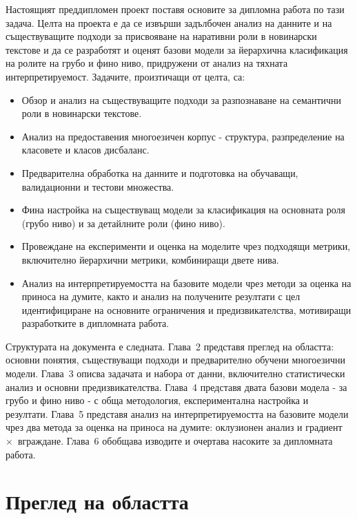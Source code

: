 \documentclass[12pt,a4paper]{report}
\begin{document}
Настоящият преддипломен проект поставя основите за дипломна работа по тази задача. Целта на проекта е да се извърши задълбочен анализ на данните и на съществуващите подходи за присвояване на наративни роли в новинарски текстове и да се разработят и оценят базови модели за йерархична класификация на ролите на грубо и фино ниво, придружени от анализ на тяхната интерпретируемост. Задачите, произтичащи от целта, са:
\begin{itemize}
  \item Обзор и анализ на съществуващите подходи за разпознаване на семантични роли в новинарски текстове.
  \item Анализ на предоставения многоезичен корпус - структура, разпределение на класовете и класов дисбаланс.
  \item Предварителна обработка на данните и подготовка на обучаващи, валидационни и тестови множества.
  \item Фина настройка на съществуващ модели за класификация на основната роля (грубо ниво) и за детайлните роли (фино ниво).
  \item Провеждане на експерименти и оценка на моделите чрез подходящи метрики, включително йерархични метрики, комбиниращи двете нива.
  \item Анализ на интерпретируемостта на базовите модели чрез методи за оценка на приноса на думите, както и анализ на получените резултати с цел идентифициране на основните ограничения и предизвикателства, мотивиращи разработките в дипломната работа.
\end{itemize}

Структурата на документа е следната. Глава~2 представя преглед на областта: основни понятия, съществуващи подходи и предварително обучени многоезични модели. Глава~3 описва задачата и набора от данни, включително статистически анализ и основни предизвикателства. Глава~4 представя двата базови модела - за грубо и фино ниво - с обща методология, експериментална настройка и резултати. Глава~5 представя анализ на интерпретируемостта на базовите модели чрез два метода за оценка на приноса на думите: оклузионен анализ и градиент~$\times$~вграждане. Глава~6 обобщава изводите и очертава насоките за дипломната работа.

\chapter{Преглед на областта}
\end{document}
